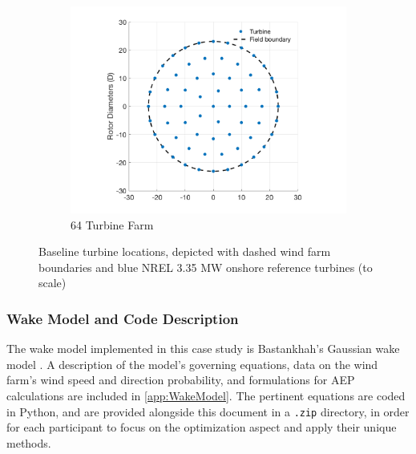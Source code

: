 \documentclass[12pt]{article}
\begin{document}
\begin{figure}[H]
            \medskip
            
            \begin{subfigure}[t]{.49\textwidth}
            \centering
            \vspace{0pt}%
            \includegraphics[width=\linewidth]{BaseCase64.png}
            \caption{64 Turbine Farm} \label{fig:BaseLoc64}
        \end{subfigure}
        \begin{minipage}[t]{.49\textwidth}
            \vspace{20pt}
            \caption{Baseline turbine locations, depicted with dashed wind farm boundaries and blue NREL 3.35 MW onshore reference turbines (to scale)}
            \label{fig:BaseLocOpt}
        \end{minipage}
    \end{figure}


\subsubsection{Wake Model and Code Description}
The wake model implemented in this case study is Bastankhah's Gaussian wake model \cite{Thomas2018, Bastankhah2014, Bastankhah2016}. A description of the model's governing equations, data on the wind farm's wind speed and direction probability, and formulations for AEP calculations are included in \cref{app:WakeModel}. The pertinent equations are coded in Python, and are provided alongside this document in a \texttt{.zip} directory, in order for each participant to focus on the optimization aspect and apply their unique methods.
\end{document}
